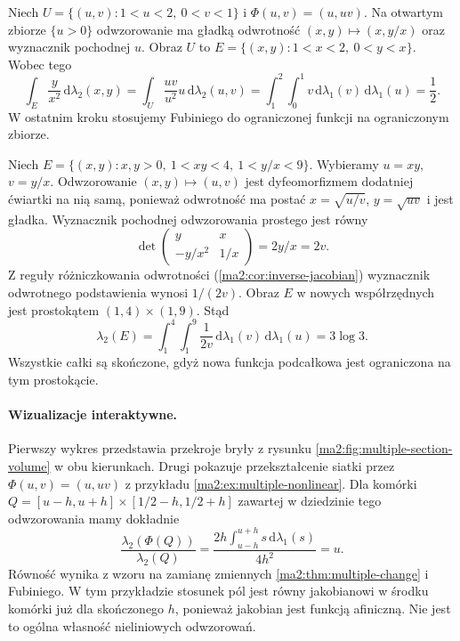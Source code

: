\begin{przyklad}
\label{ma2:ex:multiple-nonlinear}
Niech $U=\{(u,v):1<u<2,\ 0<v<1\}$ i
$\Phi(u,v)=(u,uv)$. Na otwartym zbiorze
$\{u>0\}$ odwzorowanie ma gładką odwrotność
$(x,y)\mapsto(x,y/x)$ oraz wyznacznik pochodnej
$u$. Obraz $U$ to
$E=\{(x,y):1<x<2,\ 0<y<x\}$.
Wobec tego
\[
 \int_E \frac{y}{x^2}\,\mathrm d\lambda_2(x,y)
 =\int_U\frac{uv}{u^2}u\,\mathrm d\lambda_2(u,v)
 =\int_1^2\int_0^1 v\,\mathrm d\lambda_1(v)\,
 \mathrm d\lambda_1(u)=\frac12.
\]
W ostatnim kroku stosujemy Fubiniego do
ograniczonej funkcji na ograniczonym zbiorze.
\end{przyklad}

\begin{przyklad}
\label{ma2:ex:multiple-hyperbolas}
Niech
$E=\{(x,y):x,y>0,\ 1<xy<4,\ 1<y/x<9\}$.
Wybieramy $u=xy$, $v=y/x$.
Odwzorowanie $(x,y)\mapsto(u,v)$ jest
dyfeomorfizmem dodatniej ćwiartki na nią samą,
ponieważ odwrotność ma postać
$x=\sqrt{u/v}$, $y=\sqrt{uv}$ i jest gładka.
Wyznacznik pochodnej odwzorowania prostego jest
równy
\[
 \det\begin{pmatrix}y&x\\-y/x^2&1/x\end{pmatrix}
 =2y/x=2v.
\]
Z reguły różniczkowania odwrotności
(\ref{ma2:cor:inverse-jacobian}) wyznacznik
odwrotnego podstawienia wynosi $1/(2v)$.
Obraz $E$ w nowych współrzędnych jest prostokątem
$(1,4)\times(1,9)$. Stąd
\[
 \lambda_2(E)=\int_1^4\int_1^9\frac1{2v}\,
 \mathrm d\lambda_1(v)\,\mathrm d\lambda_1(u)
 =3\log 3.
\]
Wszystkie całki są skończone, gdyż nowa funkcja
podcałkowa jest ograniczona na tym prostokącie.
\end{przyklad}


\paragraph{Wizualizacje interaktywne.}
Pierwszy wykres przedstawia przekroje bryły
z rysunku \ref{ma2:fig:multiple-section-volume}
w obu kierunkach. Drugi pokazuje
przekształcenie siatki przez $\Phi(u,v)=(u,uv)$
z przykładu \ref{ma2:ex:multiple-nonlinear}.
Dla komórki $Q=[u-h,u+h]\times[1/2-h,1/2+h]$
zawartej w dziedzinie tego odwzorowania
mamy dokładnie
\[
 \frac{\lambda_2(\Phi(Q))}{\lambda_2(Q)}
 =\frac{2h\int_{u-h}^{u+h}s\,\mathrm d\lambda_1(s)}
 {4h^2}=u.
\]
Równość wynika z wzoru na zamianę zmiennych
\ref{ma2:thm:multiple-change} i Fubiniego.
W tym przykładzie stosunek pól jest równy
jakobianowi w środku komórki już dla
skończonego $h$, ponieważ jakobian jest
funkcją afiniczną. Nie jest to ogólna
własność nieliniowych odwzorowań.

